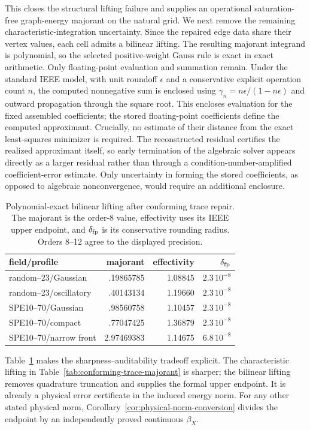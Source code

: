 \documentclass[11pt]{article}
\numberwithin{algorithm}{section}
\theoremstyle{definition}\newtheorem{definition}[theorem]{Definition}
\theoremstyle{remark}\newtheorem{remark}[theorem]{Remark}
\begin{document}
This closes the structural lifting failure and supplies an operational
saturation-free graph-energy majorant on the natural grid.  We next remove
the remaining characteristic-integration uncertainty.  Since the repaired
edge data share their vertex values, each cell admits a bilinear lifting.
The resulting majorant integrand is polynomial, so the selected
positive-weight Gauss rule is exact in exact arithmetic.  Only
floating-point evaluation and summation remain.  Under the standard IEEE
model, with unit roundoff $\epsilon$ and a conservative explicit operation
count $n$, the computed nonnegative sum is enclosed using
$\gamma_n=n\epsilon/(1-n\epsilon)$ and outward propagation through the
square root.  This encloses evaluation for the fixed assembled coefficients;
the stored floating-point coefficients define the computed approximant.
Crucially, no estimate of their distance from the exact least-squares
minimizer is required.  The reconstructed residual certifies the realized
approximant itself, so early termination of the algebraic solver appears
directly as a larger residual rather than through a condition-number-amplified
coefficient-error estimate.  Only uncertainty in forming the stored
coefficients, as opposed to algebraic nonconvergence, would require an
additional enclosure.

\begin{table}[t]
\centering
\caption{Polynomial-exact bilinear lifting after conforming trace repair.
The majorant is the order-8 value, effectivity uses its IEEE upper endpoint,
and $\delta_{\rm fp}$ is its conservative rounding radius.  Orders 8--12
agree to the displayed precision.}
\label{tab:bilinear-interval-majorant}
\begin{tabular}{lrrr}
\toprule
field/profile & majorant & effectivity & $\delta_{\rm fp}$\\
\midrule
random--23/Gaussian & .19865785 & 1.08845 & $2.3\,10^{-8}$\\
random--23/oscillatory & .40143134 & 1.19660 & $2.3\,10^{-8}$\\
SPE10--70/Gaussian & .98560758 & 1.10457 & $2.3\,10^{-8}$\\
SPE10--70/compact & .77047425 & 1.36879 & $2.3\,10^{-8}$\\
SPE10--70/narrow front & 2.97469383 & 1.14675 & $6.8\,10^{-8}$\\
\bottomrule
\end{tabular}
\end{table}

Table~\ref{tab:bilinear-interval-majorant} makes the
sharpness--auditability tradeoff explicit.  The characteristic lifting in
Table~\ref{tab:conforming-trace-majorant} is sharper; the bilinear lifting
removes quadrature truncation and supplies the formal upper endpoint.  It is
already a physical error certificate in the induced energy norm.  For any
other stated physical norm, Corollary~\ref{cor:physical-norm-conversion}
divides the endpoint by an independently proved continuous $\beta_X$.
\end{document}
